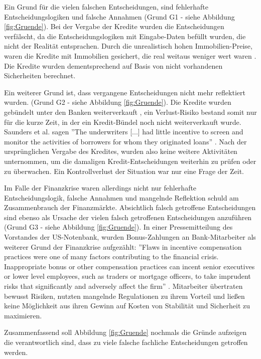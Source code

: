 Ein Grund für die vielen falschen Entscheidungen, sind fehlerhafte Entscheidungslogiken und falsche Annahmen (Grund G1 - siehe Abbildung \ref{fig:Gruende}). Bei der Vergabe der Kredite wurden die Entscheidungen verfälscht, da die Entscheidungslogiken mit Eingabe-Daten befüllt wurden, die nicht der Realität entsprachen. Durch die unrealistisch hohen Immobilien-Preise, waren die Kredite mit Immobilien gesichert, die real weitaus weniger wert waren \cite[]{HR11}. Die Kredite wurden dementsprechend auf Basis von nicht vorhandenen Sicherheiten berechnet.

Ein weiterer Grund ist, dass vergangene Entscheidungen nicht mehr reflektiert wurden. (Grund G2 - siehe Abbildung \ref{fig:Gruende}). Die Kredite wurden gebündelt unter den Banken weiterverkauft \cite[vgl. S. 2]{WN09}, ein Verlust-Risiko bestand somit nur für die kurze Zeit, in der ein Kredit-Bündel noch nicht weiterverkauft wurde. Saunders et al. sagen ''The underwriters [...] had little incentive to screen and monitor the activities of borrowers for whom they originated loans'' \cite[]{SA10}. Nach der ursprünglichen Vergabe des Kredites, wurden also keine weitere Aktivitäten unternommen, um die damaligen Kredit-Entscheidungen weiterhin zu prüfen oder zu überwachen. Ein Kontrollverlust der Situation war nur eine Frage der Zeit.            

Im Falle der Finanzkrise waren allerdings nicht nur fehlerhafte Entscheidungslogik, falsche Annahmen und mangelnde Reflektion schuld am Zusammenbrauch der Finanzmärkte. Absichtlich falsch getroffene Entscheidungen sind ebenso als Ursache der vielen falsch getroffenen Entscheidungen anzuführen (Grund G3 - siehe Abbildung \ref{fig:Gruende}). In einer Pressemitteilung des Vorstandes der US-Notenbank, wurden Bonus-Zahlungen an Bank-Mitarbeiter als weiterer Grund der Finanzkrise aufgezählt: ''Flaws in incentive compensation practices were one of many factors contributing to the financial crisis. Inappropriate bonus or other compensation practices can incent senior executives or lower level employees, such as traders or mortgage officers, to take imprudent risks that significantly and adversely affect the firm'' \cite[]{BG09}. Mitarbeiter übertraten bewusst Risiken, nutzten mangelnde Regulationen zu ihrem Vorteil und ließen keine Möglichkeit aus ihren Gewinn auf Kosten von Stabilität und Sicherheit zu maximieren. 

Zusammenfassend soll Abbildung \ref{fig:Gruende} nochmals die Gründe aufzeigen die verantwortlich sind, dass zu viele falsche fachliche Entscheidungen getroffen werden.

